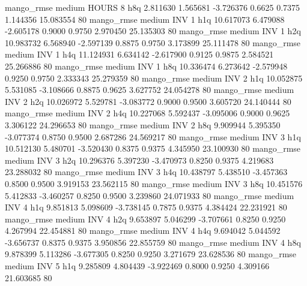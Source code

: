        mango_rmse     medium    HOURS                 8                  h8q  2.811630 1.565681 -3.726376 0.6625 0.7375  1.144356   15.083554 80
       mango_rmse     medium      INV                 1                  h1q 10.617073 6.479088 -2.605178 0.9000 0.9750  2.970450   25.135303 80
       mango_rmse     medium      INV                 1                  h2q 10.983732 6.568940 -2.597139 0.8875 0.9750  3.173899   25.111478 80
       mango_rmse     medium      INV                 1                  h4q 11.124931 6.634142 -2.617900 0.9125 0.9875  2.584521   25.266886 80
       mango_rmse     medium      INV                 1                  h8q 10.336474 6.273642 -2.579948 0.9250 0.9750  2.333343   25.279359 80
       mango_rmse     medium      INV                 2                  h1q 10.052875 5.531085 -3.108666 0.8875 0.9625  3.627752   24.054278 80
       mango_rmse     medium      INV                 2                  h2q 10.026972 5.529781 -3.083772 0.9000 0.9500  3.605720   24.140444 80
       mango_rmse     medium      INV                 2                  h4q 10.227068 5.592437 -3.095006 0.9000 0.9625  3.306122   24.296653 80
       mango_rmse     medium      INV                 2                  h8q  9.909944 5.395350 -3.077374 0.8750 0.9500  2.687286   24.569217 80
       mango_rmse     medium      INV                 3                  h1q 10.512130 5.480701 -3.520430 0.8375 0.9375  4.345950   23.100930 80
       mango_rmse     medium      INV                 3                  h2q 10.296376 5.397230 -3.470973 0.8250 0.9375  4.219683   23.288032 80
       mango_rmse     medium      INV                 3                  h4q 10.438797 5.438510 -3.457363 0.8500 0.9500  3.919153   23.562115 80
       mango_rmse     medium      INV                 3                  h8q 10.451576 5.412833 -3.460257 0.8250 0.9500  3.239860   24.071933 80
       mango_rmse     medium      INV                 4                  h1q  9.851813 5.098609 -3.738145 0.7875 0.9375  4.384424   22.231921 80
       mango_rmse     medium      INV                 4                  h2q  9.653897 5.046299 -3.707661 0.8250 0.9250  4.267994   22.454881 80
       mango_rmse     medium      INV                 4                  h4q  9.694042 5.044592 -3.656737 0.8375 0.9375  3.950856   22.855759 80
       mango_rmse     medium      INV                 4                  h8q  9.878399 5.113286 -3.677305 0.8250 0.9250  3.271679   23.628536 80
       mango_rmse     medium      INV                 5                  h1q  9.285809 4.804439 -3.922469 0.8000 0.9250  4.309166   21.603685 80
